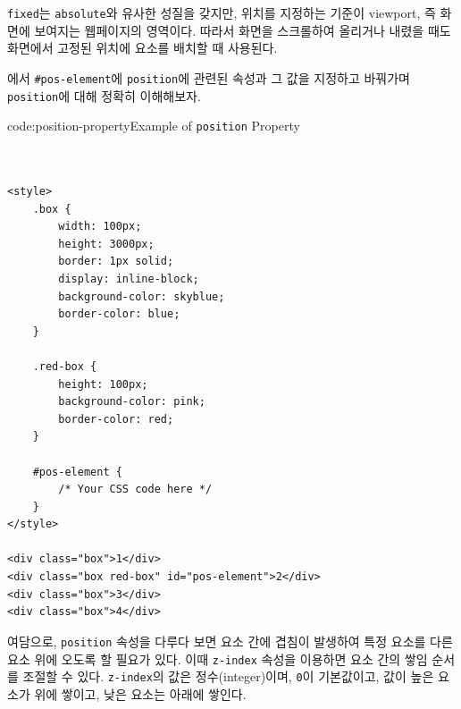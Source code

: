 \texttt{fixed}는 \texttt{absolute}와 유사한 성질을 갖지만, 위치를 지정하는 기준이 viewport, 즉 화면에 보여지는 웹페이지의 영역이다. 따라서 화면을 스크롤하여 올리거나 내렸을 때도 화면에서 고정된 위치에 요소를 배치할 때 사용된다.

 에서 \texttt{\#pos-element}에 \texttt{position}에 관련된 속성과 그 값을 지정하고 바꿔가며 \texttt{position}에 대해 정확히 이해해보자.

\begin{codeenv}{code:position-property}{Example of \texttt{position} Property}\begin{verbatim}


<style>
    .box {
        width: 100px;
        height: 3000px;
        border: 1px solid;
        display: inline-block;
        background-color: skyblue;
        border-color: blue;
    }

    .red-box {
        height: 100px;
        background-color: pink;
        border-color: red;
    }

    #pos-element {
        /* Your CSS code here */
    }
</style>

<div class="box">1</div>
<div class="box red-box" id="pos-element">2</div>
<div class="box">3</div>
<div class="box">4</div>
\end{verbatim}
\end{codeenv}

여담으로, \texttt{position} 속성을 다루다 보면 요소 간에 겹침이 발생하여 특정 요소를 다른 요소 위에 오도록 할 필요가 있다. 이때 \texttt{z-index} 속성을 이용하면 요소 간의 쌓임 순서를 조절할 수 있다. \texttt{z-index}의 값은 정수(integer)이며, \texttt{0}이 기본값이고, 값이 높은 요소가 위에 쌓이고, 낮은 요소는 아래에 쌓인다. 

